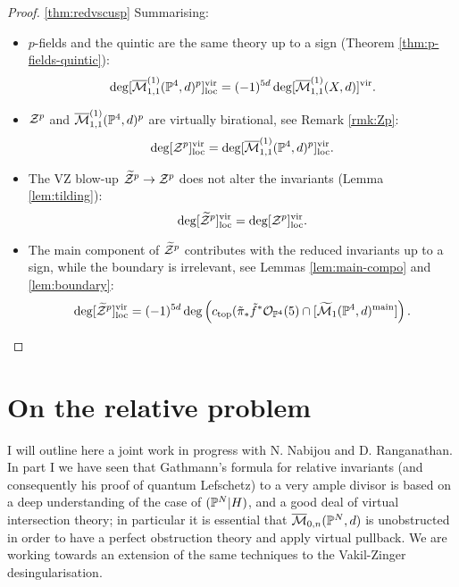 \begin{proof}\ref{thm:redvscusp}
Summarising:
\begin{itemize}[leftmargin=.5cm]
\item $p$-fields and the quintic are the same theory up to a sign (Theorem \ref{thm:p-fields-quintic}): \[\deg[\overline{\mathcal M}^{(1)}_{1,1}(\mathbb P^4,d)^p]^{\rm{vir}}_{\rm{loc}}= (-1)^{5d}\deg[\overline{\mathcal M}^{(1)}_{1,1}(X,d)]^{\rm{vir}}.\]
\item $\mathcal Z^p$ and $\overline{\mathcal M}^{(1)}_{1,1}(\mathbb P^4,d)^p$ are virtually birational, see Remark \ref{rmk:Zp}:
\[\deg[\mathcal Z^p]^{\mathrm{vir}}_{\mathrm{loc}}=\deg[\overline{\mathcal M}^{(1)}_{1,1}(\mathbb P^4,d)^p]^{\mathrm{vir}}_{\mathrm{loc}}.\]
\item The VZ blow-up $\widetilde{\mathcal Z}^p\rightarrow \mathcal Z^p$ does not alter the invariants (Lemma \ref{lem:tilding}): \[\deg[\widetilde{\mathcal Z}^p]^{\mathrm{vir}}_{\mathrm{loc}}=\deg[\mathcal Z^p]^{\mathrm{vir}}_{\mathrm{loc}}.\]
\item The main component of $\widetilde{\mathcal Z}^p$ contributes with the reduced invariants up to a sign, while the boundary is irrelevant, see Lemmas \ref{lem:main-compo} and \ref{lem:boundary}:
\[\deg[\widetilde{\mathcal Z}^p]^{\mathrm{vir}}_{\mathrm{loc}}=(-1)^{5d}\deg\left(c_{\rm{top}}(\tilde\pi_*\tilde f^*\mathcal{O}_{\mathbb P^4}(5)\cap[\widetilde{\mathcal M}_1(\mathbb P^4,d)^{\rm{main}}]\right).\]
\end{itemize}


\end{proof}
\section{On the relative problem}\label{sec:relativeone}
I will outline here a joint work in progress with N. Nabijou and D. Ranganathan. In part I we have seen that Gathmann's formula for relative invariants (and consequently his proof of quantum Lefschetz) to a very ample divisor is based on a deep understanding of the case of $(\mathbb P^N|H)$, and a good deal of virtual intersection theory; in particular it is essential that $\overline{\mathcal{M}}_{0,n}(\mathbb P^N,d)$ is unobstructed in order to have a perfect obstruction theory and apply virtual pullback. We are working towards an extension of the same techniques to the Vakil-Zinger desingularisation.
